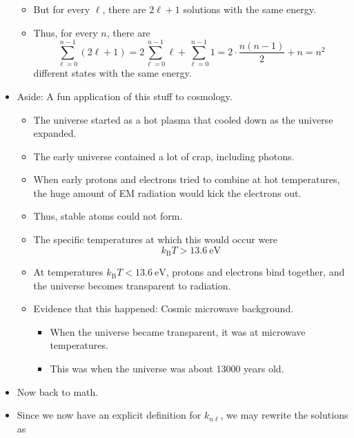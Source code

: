 \documentclass[../notes.tex]{subfiles}
\begin{document}
\begin{itemize}
    \begin{itemize}
        \item But for every $\ell$, there are $2\ell+1$ solutions with the same energy.
        \item Thus, for every $n$, there are
        \begin{equation*}
            \sum_{\ell=0}^{n-1}(2\ell+1) = 2\sum_{\ell=0}^{n-1}\ell+\sum_{\ell=0}^{n-1}1
            = 2\cdot\frac{n(n-1)}{2}+n
            = n^2
        \end{equation*}
        different states with the same energy.
    \end{itemize}
    \item Aside: A fun application of this stuff to cosmology.
    \begin{itemize}
        \item The universe started as a hot plasma that cooled down as the universe expanded.
        \item The early universe contained a lot of crap, including photons.
        \item When early protons and electrons tried to combine at hot temperatures, the huge amount of EM radiation would kick the electrons out.
        \item Thus, stable atoms could not form.
        \item The specific temperatures at which this would occur were
        \begin{equation*}
            k_\text{B}T > \SI{13.6}{\electronvolt}
        \end{equation*}
        \item At temperatures $k_\text{B}T<\SI{13.6}{\electronvolt}$, protons and electrons bind together, and the universe becomes transparent to radiation.
        \item Evidence that this happened: Cosmic microwave background.
        \begin{itemize}
            \item When the universe became transparent, it was at microwave temperatures.
            \item This was when the universe was about \num{13000} years old.
        \end{itemize}
    \end{itemize}
    \item Now back to math.
    \item Since we now have an explicit definition for $k_{n\ell}$, we may rewrite the solutions as
    \begin{equation*}

\end{equation*}
\end{itemize}
\end{document}
